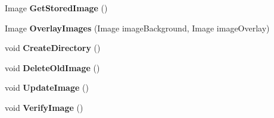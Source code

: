 \begin{DoxyCompactItemize}
\item 
\hypertarget{class_proto_test_1_1_golem_1_1_white_1_1_element_image_comparer_ac8e48a5305272a483a1b9a990d84659e}{Image {\bfseries Get\-Stored\-Image} ()}\label{class_proto_test_1_1_golem_1_1_white_1_1_element_image_comparer_ac8e48a5305272a483a1b9a990d84659e}

\item 
\hypertarget{class_proto_test_1_1_golem_1_1_white_1_1_element_image_comparer_a4c4f73b04f977c27d7480a686a9f8a00}{Image {\bfseries Overlay\-Images} (Image image\-Background, Image image\-Overlay)}\label{class_proto_test_1_1_golem_1_1_white_1_1_element_image_comparer_a4c4f73b04f977c27d7480a686a9f8a00}

\item 
\hypertarget{class_proto_test_1_1_golem_1_1_white_1_1_element_image_comparer_ab251324890f4c9b347ccb6eb7bd6f990}{void {\bfseries Create\-Directory} ()}\label{class_proto_test_1_1_golem_1_1_white_1_1_element_image_comparer_ab251324890f4c9b347ccb6eb7bd6f990}

\item 
\hypertarget{class_proto_test_1_1_golem_1_1_white_1_1_element_image_comparer_ad8c9f3461f38ca02b877cecb3a9a6d3a}{void {\bfseries Delete\-Old\-Image} ()}\label{class_proto_test_1_1_golem_1_1_white_1_1_element_image_comparer_ad8c9f3461f38ca02b877cecb3a9a6d3a}

\item 
\hypertarget{class_proto_test_1_1_golem_1_1_white_1_1_element_image_comparer_a852f180a673e7d592d079c8429019e80}{void {\bfseries Update\-Image} ()}\label{class_proto_test_1_1_golem_1_1_white_1_1_element_image_comparer_a852f180a673e7d592d079c8429019e80}

\item 
\hypertarget{class_proto_test_1_1_golem_1_1_white_1_1_element_image_comparer_abccbe142daa6dc342ac15c070467430e}{void {\bfseries Verify\-Image} ()}\label{class_proto_test_1_1_golem_1_1_white_1_1_element_image_comparer_abccbe142daa6dc342ac15c070467430e}

\end{DoxyCompactItemize}
